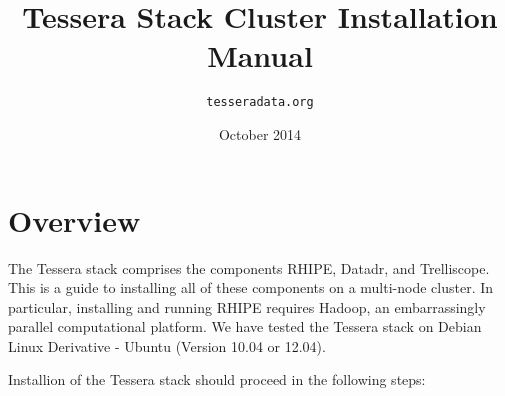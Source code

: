 \documentclass[11pt]{article}
\title{
}
\date{}
\title{
\vspace{2in}
\textbf{Tessera Stack Cluster Installation Manual} \\
\vspace{3in}
}
\author{\texttt{tesseradata.org}}
\date{October 2014}
\begin{document}
\maketitle
\thispagestyle{empty}

\newpage
\tableofcontents
\newpage

\section{Overview}

The Tessera stack comprises the components RHIPE, Datadr, and
Trelliscope. This is a guide to installing all of these components on a
multi-node cluster. In particular, installing and running RHIPE requires
Hadoop, an embarrassingly parallel computational platform. We have
tested the Tessera stack on Debian Linux Derivative - Ubuntu (Version
10.04 or 12.04).

Installion of the Tessera stack should proceed in the following steps:
\end{document}

